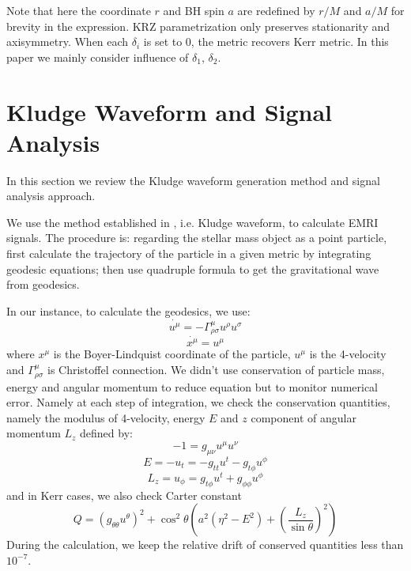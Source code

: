 \documentclass{article}
\begin{document}
Note that here the coordinate $r$ and BH spin $a$ are redefined by $r/M$ and $a/M$ for brevity in the expression. KRZ parametrization only preserves stationarity and axisymmetry. When each $\delta_i$ is set to 0, the metric recovers Kerr metric. In this paper we mainly consider influence of $\delta_1, \, \delta_2$.


\section{Kludge Waveform and Signal Analysis}
\label{p_wave}

In this section we review the Kludge waveform generation method and signal analysis approach. 


We use the method established in \cite{kludge}, i.e. Kludge waveform, to calculate EMRI signals. The procedure is: regarding the stellar mass object as a point particle, first calculate the trajectory of the particle in a given metric by integrating geodesic equations; then use quadruple formula to get the gravitational wave from geodesics.

In our instance, to calculate the geodesics, we use:
\begin{equation}
	\dot{u^\mu}=-\Gamma^\mu_{\rho\sigma}u^\rho u^\sigma
\end{equation}
\begin{equation}
	\dot{x^\mu}=u^\mu 
\end{equation}
where $x^\mu$ is the Boyer-Lindquist coordinate of the particle, $u^\mu$ is the 4-velocity and $\Gamma^\mu_{\rho\sigma}$ is Christoffel connection. We didn't use conservation of particle mass, energy and angular momentum to reduce equation but to monitor numerical error. Namely at each step of integration, we check the conservation quantities, namely the modulus of 4-velocity, energy $E$ and $z$ component of angular momentum $L_z$ defined by:
\begin{equation}
	-1 = g_{\mu\nu} u^\mu u^\nu
\end{equation}
\begin{equation}
	E = -u_t = - g_{tt} u^t -g_{t\phi} u^\phi
\end{equation}
\begin{equation}
	L_z = u_\phi = g_{t\phi } u^t + g_{\phi\phi} u^\phi
\end{equation}
 and in Kerr cases, we also check Carter constant
 \begin{equation}
 	Q = (g_{\theta\theta} u^\theta)^2 + \cos ^2 \theta (a^2 (\eta^2-E^2) + (\frac{L_z}{\sin \theta})^2 )
 \end{equation}
During the calculation, we keep the relative drift of conserved quantities less than $10^{-7}$.
\end{document}
